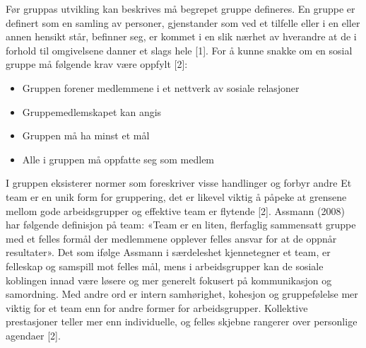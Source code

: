 Før gruppas utvikling kan beskrives må begrepet gruppe defineres. En gruppe er definert som en samling av personer, gjenstander som ved et tilfelle eller i en eller annen hensikt står, befinner seg, er kommet i en slik nærhet av hverandre at de i forhold til omgivelsene danner et slags hele [1]. 
For å kunne snakke om en sosial gruppe må følgende krav være oppfylt [2]:
\begin{itemize}
\item Gruppen forener medlemmene i et nettverk av sosiale relasjoner
\item Gruppemedlemskapet kan angis
\item Gruppen må ha minst et mål
\item Alle i gruppen må oppfatte seg som medlem
\end{itemize}
I gruppen eksisterer normer som foreskriver visse handlinger og forbyr andre
Et team er en unik form for gruppering, det er likevel viktig å påpeke at grensene mellom gode arbeidsgrupper og effektive team er flytende [2].
Assmann (2008) har følgende definisjon på team: «Team er en liten, flerfaglig sammensatt gruppe med et felles formål der medlemmene opplever felles ansvar for at de oppnår resultater».
Det som ifølge Assmann i særdeleshet kjennetegner et team, er felleskap og samspill mot felles mål, mens i arbeidsgrupper kan de sosiale koblingen innad være løsere og mer generelt fokusert på kommunikasjon og samordning.
Med andre ord er intern samhørighet, kohesjon og gruppefølelse mer viktig for et team enn for andre former for arbeidsgrupper.
Kollektive prestasjoner teller mer enn individuelle, og felles skjebne rangerer over personlige agendaer [2].